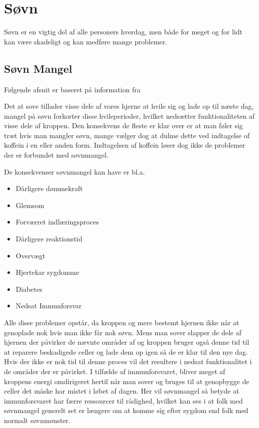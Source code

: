 \section{Søvn}
Søvn er en vigtig del af alle personers hverdag, men både for meget og for lidt kan være skadeligt og kan medføre mange problemer.

\subsection{Søvn Mangel}
Følgende afsnit er baseret på information fra \citep{misc:tenThings} \citep{misc:getSleep}

Det at sove tillader visse dele af vores hjerne at hvile sig og lade op til næste dag, mangel på søvn forkorter disse hvileperioder, hvilket nedsætter funktionaliteten af visse dele af kroppen.
Den konsekvens de fleste er klar over er at man føler sig træt hvis man mangler søvn, mange vælger dog at dulme dette ved indtagelse of koffein i en eller anden form.
Indtagelsen af koffein løser dog ikke de problemer der er forbundet med søvnmangel. 

De konsekvenser søvnmangel kan have er bl.a.
\begin{itemize}
\item Dårligere dømmekraft
\item Glemsom
\item Forværret indlæringsproces
\item Dårligere reaktionstid
\item Overvægt
\item Hjertekar sygdomme
\item Diabetes
\item Nedsat Immunforsvar
\end{itemize}

Alle disse problemer opstår, da kroppen og mere bestemt hjernen ikke når at genoplade nok hvis man ikke får nok søvn.
Mens man sover slapper de dele af hjernen der påvirker de nævnte områder af og kroppen bruger også denne tid til at reparere beskadigede celler og lade dem op igen så de er klar til den nye dag.
Hvis der ikke er nok tid til denne proces vil det resultere i nedsat funktionalitet i de områder der er påvirket.
I tilfælde af immunforsvaret, bliver meget af kroppens energi omdirigeret hertil når man sover og bruges til at genopbygge de celler det måske har mistet i løbet af dagen.
Her vil søvnmangel så betyde at immunforsvaret har færre ressourcer til rådighed, hvilket kan ses i at folk med søvnmangel generelt set er længere om at komme sig efter sygdom end folk med normalt søvnmønster.

